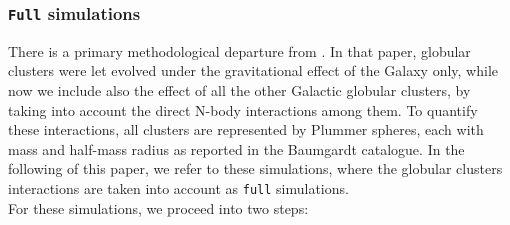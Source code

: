 \documentclass[draft]{aa}
\begin{document}
    \subsubsection*{ \texttt{Full} simulations}
    There is a primary methodological departure from \citet{2023A&A...673A..44F}.  In that paper, globular clusters were let evolved under the gravitational effect of the Galaxy only, while now we include also the effect of all the other Galactic globular clusters, by taking into account the direct N-body interactions among them. To quantify these interactions, all clusters are represented by Plummer spheres, each with mass and half-mass radius as reported in the Baumgardt catalogue. In the following of this paper, we refer to these simulations, where the globular clusters interactions are taken into account as \texttt{full} simulations. \\
    For these simulations, we proceed into two steps:
\end{document}
